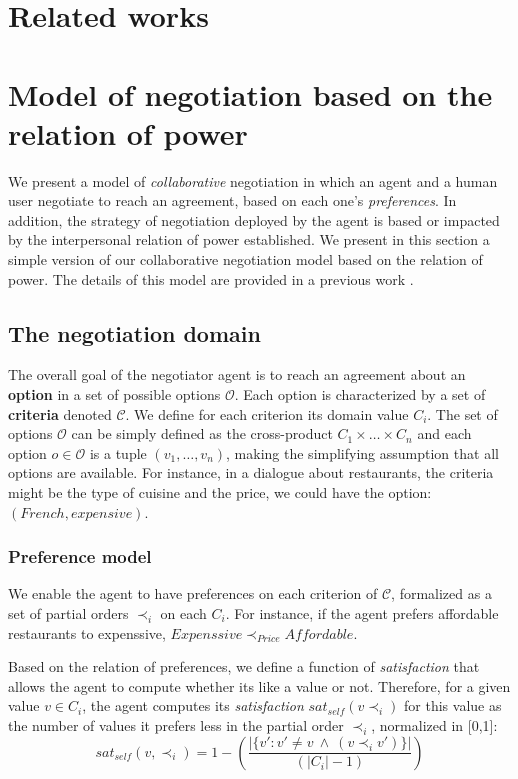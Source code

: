 \documentclass[runningheads,a4paper]{llncs}
\begin{document}
	\section{Related works}	
	
	\section{Model of negotiation based on the relation of power}
	We present a model of \textit{collaborative} negotiation in which an agent and a human user negotiate to reach an agreement, based on each one's \textit{preferences}. In addition, the strategy of negotiation deployed by the agent is based or impacted by the interpersonal relation of power established.
	We present in this section a simple version of our collaborative negotiation model based on the relation of power. The details of this model are  provided in a previous work \cite{ouali2017computational}.
	\subsection{The negotiation domain}
	
	The overall goal of the negotiator agent is to reach an agreement about an \textbf{option} in a set of possible options $\mathcal{O}$. 
	Each option is characterized by a set of \textbf{criteria} denoted $\mathcal{C}$. We define for each criterion its domain value $C_i$.
	The set of options $\mathcal{O}$ can be simply defined as the cross-product $C_1\times\ldots\times C_n$ and each option $o\in\mathcal{O}$ is a tuple $(v_1,\ldots,v_n)$, making the simplifying assumption that all options are available. For instance, in a dialogue about restaurants, the criteria might be the type of cuisine and the price, we could have the option: $(French,expensive)$.
	
	\subsubsection{Preference model} 
	We enable the agent to have preferences on each criterion of $\mathcal{C}$, formalized as a set of partial orders $\prec_i$ on each $C_i$. For instance, if the agent prefers affordable restaurants to expenssive, $Expenssive\prec_{Price}Affordable$.
	
	Based on the relation of preferences, we define a function of \emph{satisfaction} that allows the agent to compute whether its like a value or not. Therefore, for a given value $v\in C_i$, the agent computes its \emph{satisfaction} $sat_{self}(v \prec_i)$ for this value as the number of values it prefers less in the partial order $\prec_i$, normalized in [0,1]:
	\vspace{-.5em} 
	\begin{equation}
	sat_{self}(v, \prec_i) =	1 - \left( \frac{|\{v' : v' \neq v \  \wedge \ (v \prec_i v')\}| }{( |C_i| - 1 )}\right)
	\end{equation}
	
\end{document}
